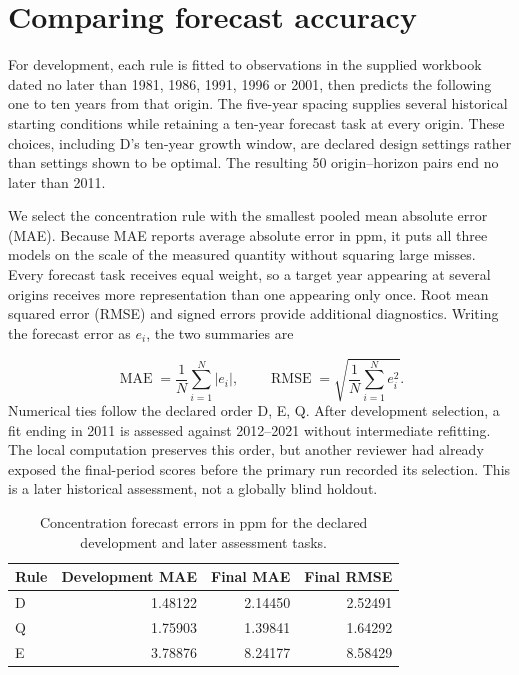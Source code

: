 \documentclass[11pt,a4paper]{article}
\newcommand{\p}[2]{#2\par}
\newcommand{\txt}[2]{#2}
\begin{document}
\section{Comparing forecast accuracy}\label{sec:validation}
\p{VAL01}{For development, each rule is fitted to observations in the supplied workbook dated no later than 1981, 1986, 1991, 1996 or 2001, then predicts the following one to ten years from that origin. The five-year spacing supplies several historical starting conditions while retaining a ten-year forecast task at every origin. These choices, including D's ten-year growth window, are declared design settings rather than settings shown to be optimal. The resulting 50 origin--horizon pairs end no later than 2011.}
\p{VAL02}{We select the concentration rule with the smallest pooled mean absolute error (MAE). Because MAE reports average absolute error in ppm, it puts all three models on the scale of the measured quantity without squaring large misses. Every forecast task receives equal weight, so a target year appearing at several origins receives more representation than one appearing only once. Root mean squared error (RMSE) and signed errors provide additional diagnostics. Writing the forecast error as $e_i$, the two summaries are}\nopagebreak
\begin{equation}\label{eq:errors}
\operatorname{MAE}=\frac{1}{N}\sum_{i=1}^{N}|e_i|,\qquad
\operatorname{RMSE}=\sqrt{\frac{1}{N}\sum_{i=1}^{N}e_i^2}.
\end{equation}
\p{VAL03}{Numerical ties follow the declared order D, E, Q. After development selection, a fit ending in 2011 is assessed against 2012--2021 without intermediate refitting. The local computation preserves this order, but another reviewer had already exposed the final-period scores before the primary run recorded its selection. This is a later historical assessment, not a globally blind holdout.}
\begin{table}[H]\centering\small
\caption{\txt{TC04}{Concentration forecast errors in ppm for the declared development and later assessment tasks.}}\label{tab:co2-errors}
\begin{tabular}{lrrr}\toprule
Rule & Development MAE & Final MAE & Final RMSE\\\midrule
D & 1.48122 & 2.14450 & 2.52491\\
Q & 1.75903 & 1.39841 & 1.64292\\
E & 3.78876 & 8.24177 & 8.58429\\\bottomrule
\end{tabular}
\end{table}
\end{document}
